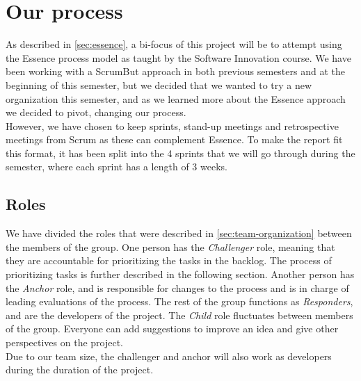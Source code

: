 \section{Our process}\label{sprint1:ourprocess}
As described in \autoref{sec:essence}, a bi-focus of this project will be to attempt using the Essence process model as taught by the Software Innovation course.
We have been working with a ScrumBut approach in both previous semesters and at the beginning of this semester, but we decided that we wanted to try a new organization this semester, and as we learned more about the Essence approach we decided to pivot, changing our process. \\
However, we have chosen to keep sprints, stand-up meetings and retrospective meetings from Scrum as these can complement Essence.
To make the report fit this format, it has been split into the 4 sprints that we will go through during the semester, where each sprint has a length of 3 weeks.

\subsection{Roles}
We have divided the roles that were described in \autoref{sec:team-organization} between the members of the group.
One person has the \textit{Challenger} role, meaning that they are accountable for prioritizing the tasks in the backlog.
The process of prioritizing tasks is further described in the following section.
Another person has the \textit{Anchor} role, and is responsible for changes to the process and is in charge of leading evaluations of the process.
The rest of the group functions as \textit{Responders}, and are the developers of the project.
The \textit{Child} role fluctuates between members of the group.
Everyone can add suggestions to improve an idea and give other perspectives on the project. \\
Due to our team size, the challenger and anchor will also work as developers during the duration of the project.

